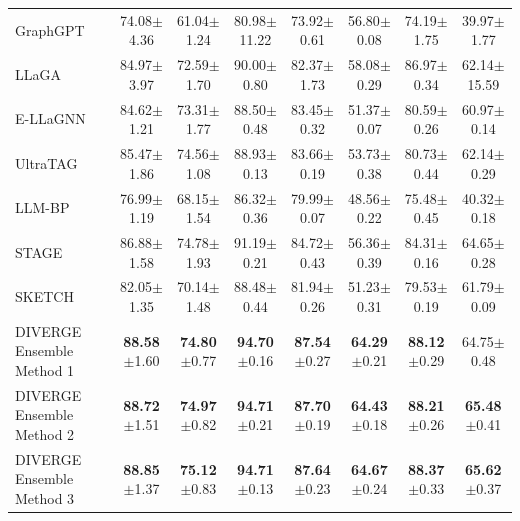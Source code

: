 \documentclass[a4paper,fleqn]{cas-sc}
\DeclareRobustCommand{\revcommon}[2][]{\textcolor{revshared}{#2}} %
\begin{document}
\begin{table}[htbp]
\begin{tabular*}{\textwidth}{@{\extracolsep{\fill}} lccccccc @{}}
GraphGPT     & 74.08{\scriptsize$\pm$4.36} & 61.04{\scriptsize$\pm$1.24} & 80.98{\scriptsize$\pm$11.22} & 73.92{\scriptsize$\pm$0.61} & 56.80{\scriptsize$\pm$0.08} & 74.19{\scriptsize$\pm$1.75} & 39.97{\scriptsize$\pm$1.77} \\
LLaGA        & 84.97{\scriptsize$\pm$3.97} & 72.59{\scriptsize$\pm$1.70} & 90.00{\scriptsize$\pm$0.80} & 82.37{\scriptsize$\pm$1.73} & 58.08{\scriptsize$\pm$0.29} & 86.97{\scriptsize$\pm$0.34} & 62.14{\scriptsize$\pm$15.59} \\
\revcommon[R2,R4]{E-LLaGNN}     & 84.62{\scriptsize$\pm$1.21} & 73.31{\scriptsize$\pm$1.77} & 88.50{\scriptsize$\pm$0.48} & 83.45{\scriptsize$\pm$0.32} & 51.37{\scriptsize$\pm$0.07} & 80.59{\scriptsize$\pm$0.26} & 60.97{\scriptsize$\pm$0.14} \\
\revcommon[R2,R4]{UltraTAG}     & 85.47{\scriptsize$\pm$1.86} & 74.56{\scriptsize$\pm$1.08} & 88.93{\scriptsize$\pm$0.13} & 83.66{\scriptsize$\pm$0.19} & 53.73{\scriptsize$\pm$0.38} & 80.73{\scriptsize$\pm$0.44} & 62.14{\scriptsize$\pm$0.29} \\
\revcommon[R2,R4]{LLM-BP}       & 76.99{\scriptsize$\pm$1.19} & 68.15{\scriptsize$\pm$1.54} & 86.32{\scriptsize$\pm$0.36} & 79.99{\scriptsize$\pm$0.07} & 48.56{\scriptsize$\pm$0.22} & 75.48{\scriptsize$\pm$0.45} & 40.32{\scriptsize$\pm$0.18} \\
\revcommon[R2,R4]{STAGE}        & 86.88{\scriptsize$\pm$1.58} & 74.78{\scriptsize$\pm$1.93} & 91.19{\scriptsize$\pm$0.21} & 84.72{\scriptsize$\pm$0.43} & 56.36{\scriptsize$\pm$0.39} & 84.31{\scriptsize$\pm$0.16} & 64.65{\scriptsize$\pm$0.28} \\
\revcommon[R2,R4]{SKETCH}       & 82.05{\scriptsize$\pm$1.35} & 70.14{\scriptsize$\pm$1.48} & 88.48{\scriptsize$\pm$0.44} & 81.94{\scriptsize$\pm$0.26} & 51.23{\scriptsize$\pm$0.31} & 79.53{\scriptsize$\pm$0.19} & 61.79{\scriptsize$\pm$0.09} \\
\midrule

DIVERGE Ensemble Method 1 & \textbf{88.58}{\scriptsize$\pm$1.60} & \textbf{74.80}{\scriptsize$\pm$0.77} & \textbf{94.70}{\scriptsize$\pm$0.16} & \textbf{87.54}{\scriptsize$\pm$0.27} & \textbf{64.29}{\scriptsize$\pm$0.21} & \textbf{88.12}{\scriptsize$\pm$0.29} & 64.75{\scriptsize$\pm$0.48} \\
DIVERGE Ensemble Method 2 & \textbf{88.72}{\scriptsize$\pm$1.51} & \textbf{74.97}{\scriptsize$\pm$0.82} & \textbf{94.71}{\scriptsize$\pm$0.21} & \textbf{87.70}{\scriptsize$\pm$0.19} & \textbf{64.43}{\scriptsize$\pm$0.18} & \textbf{88.21}{\scriptsize$\pm$0.26} & \textbf{65.48}{\scriptsize$\pm$0.41} \\
DIVERGE Ensemble Method 3 & \textbf{88.85}{\scriptsize$\pm$1.37} & \textbf{75.12}{\scriptsize$\pm$0.83} & \textbf{94.71}{\scriptsize$\pm$0.13} & \textbf{87.64}{\scriptsize$\pm$0.23} & \textbf{64.67}{\scriptsize$\pm$0.24} & \textbf{88.37}{\scriptsize$\pm$0.33} & \textbf{65.62}{\scriptsize$\pm$0.37} \\
\bottomrule
\end{tabular*}
\end{table}
\end{document}
